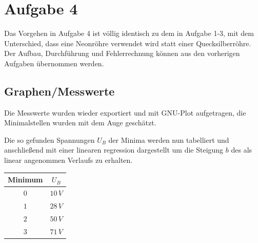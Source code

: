\section{Aufgabe 4}
Das Vorgehen in Aufgabe 4 ist völlig identisch zu dem in Aufgabe 1-3, mit dem Unterschied, dass eine Neonröhre verwendet wird statt einer Quecksilberröhre. Der Aufbau, Durchführung und Fehlerrechnung können aus den vorherigen Aufgaben übernommen werden.
\subsection{Graphen/Messwerte}
Die Messwerte wurden wieder exportiert und mit GNU-Plot aufgetragen, die Minimalstellen wurden mit dem Auge geschätzt.
\begin{center}
\begin{minipage}{\linewidth}
\centering
{}
\label{a3}
\end{minipage}
\end{center}
Die so gefunden Spannungen \(U_B\) der Minima werden nun tabelliert und anschließend mit einer linearen regression dargestellt um die Steigung \(b\) des als linear angenommen Verlaufs zu erhalten.
\begin{center}
\begin{tabular}{c|c}
Minimum & \(U_B\)\\\hline
\(0\) & \(10\, V\)\\
\(1\) & \(28\, V\)\\
\(2\) & \(50\, V\)\\
\(3\) & \(71\, V\)\\
\end{tabular}
\end{center}
